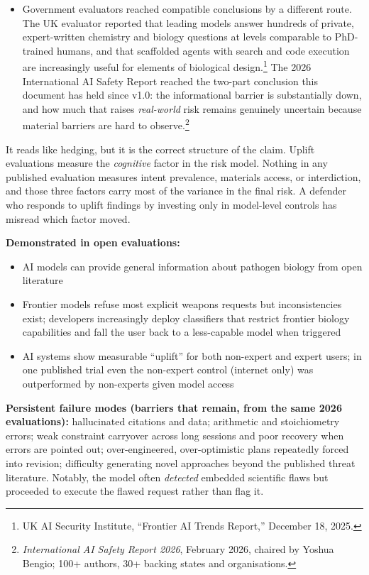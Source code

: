 \documentclass[11pt,letterpaper]{article}
\begin{document}
\begin{itemize}[nosep]
  \item Government evaluators reached compatible conclusions by a different route. The UK evaluator reported that leading models answer hundreds of private, expert-written chemistry and biology questions at levels comparable to PhD-trained humans, and that scaffolded agents with search and code execution are increasingly useful for elements of biological design.\footnote{UK AI Security Institute, ``Frontier AI Trends Report,'' December 18, 2025.} The 2026 International AI Safety Report reached the two-part conclusion this document has held since v1.0: the informational barrier is substantially down, and how much that raises \textit{real-world} risk remains genuinely uncertain because material barriers are hard to observe.\footnote{\textit{International AI Safety Report 2026}, February 2026, chaired by Yoshua Bengio; 100+ authors, 30+ backing states and organisations.}
\end{itemize}

\begin{notebox}
It reads like hedging, but it is the correct structure of the claim. Uplift evaluations measure the \textit{cognitive} factor in the risk model. Nothing in any published evaluation measures intent prevalence, materials access, or interdiction, and those three factors carry most of the variance in the final risk. A defender who responds to uplift findings by investing only in model-level controls has misread which factor moved.
\end{notebox}

\textbf{Demonstrated in open evaluations:}
\begin{itemize}[nosep]
  \item AI models can provide general information about pathogen biology from open literature
  \item Frontier models refuse most explicit weapons requests but inconsistencies exist; developers increasingly deploy classifiers that restrict frontier biology capabilities and fall the user back to a less-capable model when triggered
  \item AI systems show measurable ``uplift'' for both non-expert and expert users; in one published trial even the non-expert control (internet only) was outperformed by non-experts given model access
\end{itemize}

\textbf{Persistent failure modes (barriers that remain, from the same 2026 evaluations):} hallucinated citations and data; arithmetic and stoichiometry errors; weak constraint carryover across long sessions and poor recovery when errors are pointed out; over-engineered, over-optimistic plans repeatedly forced into revision; difficulty generating novel approaches beyond the published threat literature. Notably, the model often \textit{detected} embedded scientific flaws but proceeded to execute the flawed request rather than flag it.
\end{document}
